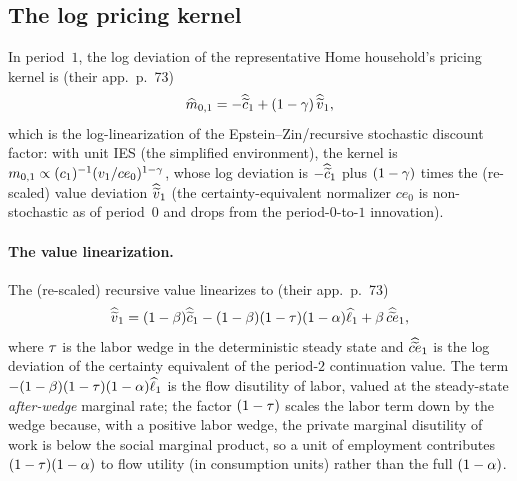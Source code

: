 \subsection{The log pricing kernel}
\label{sec:log-kernel}

In period~$1$, the log deviation of the representative Home household's pricing
kernel is (their app.~p.~73)
\begin{equation}
\widehat{m}_{0,1} = -\widehat{\widetilde{c}}_1 + (1-\gamma)\,\widehat{\widetilde{v}}_1, \label{eq:m01}
\end{equation}
which is the log-linearization of the Epstein--Zin/recursive stochastic discount
factor: with unit IES (the simplified environment), the kernel is
$m_{0,1}\propto (c_1)^{-1}(v_1/ce_0)^{1-\gamma}$, whose log deviation is
$-\widehat{\widetilde{c}}_1$ plus $(1-\gamma)$ times the (re-scaled) value deviation
$\widehat{\widetilde{v}}_1$ (the certainty-equivalent normalizer $ce_0$ is non-stochastic
as of period~$0$ and drops from the period-$0$-to-$1$ innovation).

\paragraph{The value linearization.} The (re-scaled) recursive value linearizes
to (their app.~p.~73)
\begin{equation}
\widehat{\widetilde{v}}_1 = (1-\beta)\widehat{\widetilde{c}}_1 - (1-\beta)(1-\tau)(1-\alpha)\widehat{\ell}_1 + \beta\,\widehat{\widetilde{ce}}_1, \label{eq:v1}
\end{equation}
where $\tau$ is the labor wedge in the deterministic steady state and
$\widehat{\widetilde{ce}}_1$ is the log deviation of the certainty equivalent of the
period-$2$ continuation value. The term
$-(1-\beta)(1-\tau)(1-\alpha)\widehat{\ell}_1$ is the flow disutility of labor,
valued at the steady-state \emph{after-wedge} marginal rate; the factor
$(1-\tau)$ scales the labor term down by the wedge because, with a positive
labor wedge, the private marginal disutility of work is below the social marginal
product, so a unit of employment contributes
$(1-\tau)(1-\alpha)$ to flow utility (in consumption units) rather than the
full $(1-\alpha)$.

